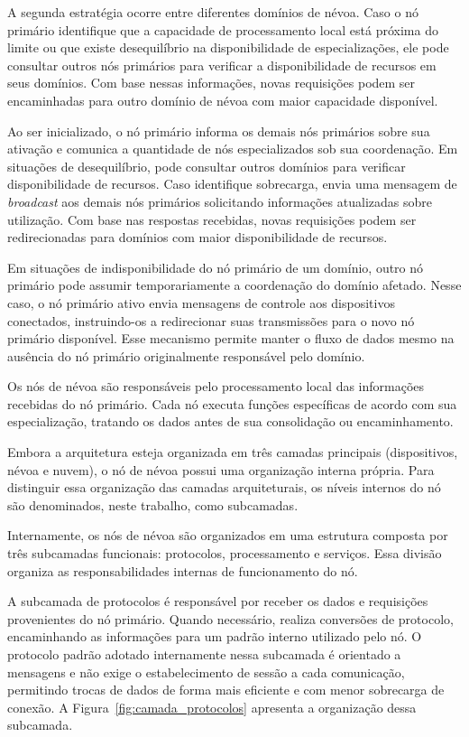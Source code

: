 A segunda estratégia ocorre entre diferentes domínios de névoa. Caso o nó primário identifique que a capacidade de processamento local está próxima do limite ou que existe desequilíbrio na disponibilidade de especializações, ele pode consultar outros nós primários para verificar a disponibilidade de recursos em seus domínios. Com base nessas informações, novas requisições podem ser encaminhadas para outro domínio de névoa com maior capacidade disponível.

Ao ser inicializado, o nó primário informa os demais nós primários sobre
sua ativação e comunica a quantidade de nós especializados sob sua
coordenação. Em situações de desequilíbrio, pode consultar outros domínios
para verificar disponibilidade de recursos. Caso identifique sobrecarga,
envia uma mensagem de \textit{broadcast} aos demais nós primários solicitando
informações atualizadas sobre utilização. Com base nas respostas recebidas,
novas requisições podem ser redirecionadas para domínios com maior disponibilidade de recursos.

Em situações de indisponibilidade do nó primário de um domínio, outro nó primário pode assumir temporariamente a coordenação do domínio afetado. Nesse caso, o nó primário ativo envia mensagens de controle aos dispositivos conectados, instruindo-os a redirecionar suas transmissões para o novo nó primário disponível. Esse mecanismo permite manter o fluxo de dados mesmo na ausência do nó primário originalmente responsável pelo domínio.

Os nós de névoa são responsáveis pelo processamento local das informações
recebidas do nó primário. Cada nó executa funções específicas de acordo
com sua especialização, tratando os dados antes de sua consolidação ou
encaminhamento.

Embora a arquitetura esteja organizada em três camadas principais
(dispositivos, névoa e nuvem), o nó de névoa possui uma organização
interna própria. Para distinguir essa organização das camadas
arquiteturais, os níveis internos do nó são denominados, neste trabalho,
como subcamadas.

Internamente, os nós de névoa são organizados em uma estrutura composta
por três subcamadas funcionais: protocolos, processamento e serviços.
Essa divisão organiza as responsabilidades internas de funcionamento do nó.

A subcamada de protocolos é responsável por receber os dados e requisições provenientes do nó primário. Quando necessário, realiza conversões de protocolo, encaminhando as informações para um padrão interno utilizado pelo nó. O protocolo padrão adotado internamente nessa subcamada é orientado a mensagens e não exige o estabelecimento de sessão a cada comunicação, permitindo trocas de dados de forma mais eficiente e com menor sobrecarga de conexão. A Figura~\ref{fig:camada_protocolos} apresenta a organização dessa subcamada.

